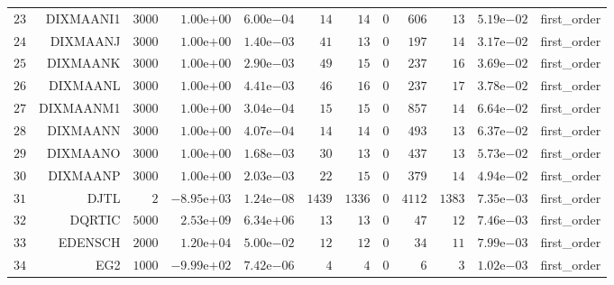\begin{longtable}{rrrrrrrrrrrr}
  \(    23\) & DIXMAANI1 & \(  3000\) & \( 1.00\)e\(+00\) & \( 6.00\)e\(-04\) & \(    14\) & \(    14\) & \(     0\) & \(   606\) & \(    13\) & \( 5.19\)e\(-02\) & first\_order \\
  \(    24\) & DIXMAANJ & \(  3000\) & \( 1.00\)e\(+00\) & \( 1.40\)e\(-03\) & \(    41\) & \(    13\) & \(     0\) & \(   197\) & \(    14\) & \( 3.17\)e\(-02\) & first\_order \\
  \(    25\) & DIXMAANK & \(  3000\) & \( 1.00\)e\(+00\) & \( 2.90\)e\(-03\) & \(    49\) & \(    15\) & \(     0\) & \(   237\) & \(    16\) & \( 3.69\)e\(-02\) & first\_order \\
  \(    26\) & DIXMAANL & \(  3000\) & \( 1.00\)e\(+00\) & \( 4.41\)e\(-03\) & \(    46\) & \(    16\) & \(     0\) & \(   237\) & \(    17\) & \( 3.78\)e\(-02\) & first\_order \\
  \(    27\) & DIXMAANM1 & \(  3000\) & \( 1.00\)e\(+00\) & \( 3.04\)e\(-04\) & \(    15\) & \(    15\) & \(     0\) & \(   857\) & \(    14\) & \( 6.64\)e\(-02\) & first\_order \\
  \(    28\) & DIXMAANN & \(  3000\) & \( 1.00\)e\(+00\) & \( 4.07\)e\(-04\) & \(    14\) & \(    14\) & \(     0\) & \(   493\) & \(    13\) & \( 6.37\)e\(-02\) & first\_order \\
  \(    29\) & DIXMAANO & \(  3000\) & \( 1.00\)e\(+00\) & \( 1.68\)e\(-03\) & \(    30\) & \(    13\) & \(     0\) & \(   437\) & \(    13\) & \( 5.73\)e\(-02\) & first\_order \\
  \(    30\) & DIXMAANP & \(  3000\) & \( 1.00\)e\(+00\) & \( 2.03\)e\(-03\) & \(    22\) & \(    15\) & \(     0\) & \(   379\) & \(    14\) & \( 4.94\)e\(-02\) & first\_order \\
  \(    31\) & DJTL & \(     2\) & \(-8.95\)e\(+03\) & \( 1.24\)e\(-08\) & \(  1439\) & \(  1336\) & \(     0\) & \(  4112\) & \(  1383\) & \( 7.35\)e\(-03\) & first\_order \\
  \(    32\) & DQRTIC & \(  5000\) & \( 2.53\)e\(+09\) & \( 6.34\)e\(+06\) & \(    13\) & \(    13\) & \(     0\) & \(    47\) & \(    12\) & \( 7.46\)e\(-03\) & first\_order \\
  \(    33\) & EDENSCH & \(  2000\) & \( 1.20\)e\(+04\) & \( 5.00\)e\(-02\) & \(    12\) & \(    12\) & \(     0\) & \(    34\) & \(    11\) & \( 7.99\)e\(-03\) & first\_order \\
  \(    34\) & EG2 & \(  1000\) & \(-9.99\)e\(+02\) & \( 7.42\)e\(-06\) & \(     4\) & \(     4\) & \(     0\) & \(     6\) & \(     3\) & \( 1.02\)e\(-03\) & first\_order \\

\end{longtable}
